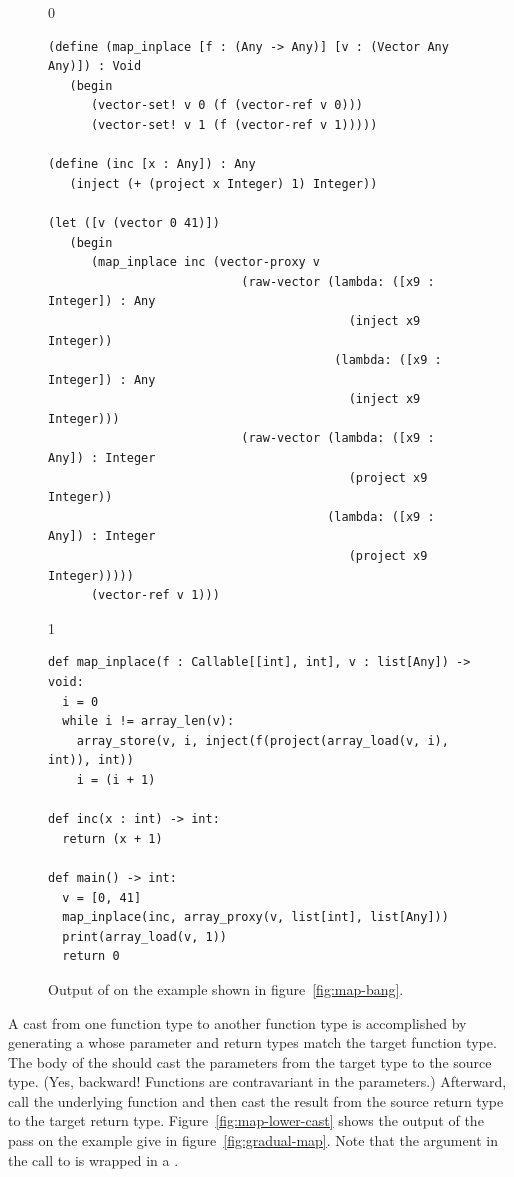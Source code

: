 \documentclass[7x10]{TimesAPriori_MIT}%
\def\racketEd{0}
\def\pythonEd{1}
\def\edition{1}
\newcommand{\pythonColor}[0]{}
\numberwithin{theorem}{chapter}
\numberwithin{definition}{chapter}
\numberwithin{equation}{chapter}
\begin{document}
\begin{figure}[tbp]
\begin{tcolorbox}[colback=white]  
{\if\edition\racketEd    
\begin{lstlisting}
(define (map_inplace [f : (Any -> Any)] [v : (Vector Any Any)]) : Void
   (begin 
      (vector-set! v 0 (f (vector-ref v 0)))
      (vector-set! v 1 (f (vector-ref v 1)))))
  
(define (inc [x : Any]) : Any
   (inject (+ (project x Integer) 1) Integer))

(let ([v (vector 0 41)])
   (begin 
      (map_inplace inc (vector-proxy v
                           (raw-vector (lambda: ([x9 : Integer]) : Any
                                          (inject x9 Integer))
                                        (lambda: ([x9 : Integer]) : Any
                                          (inject x9 Integer)))
                           (raw-vector (lambda: ([x9 : Any]) : Integer
                                          (project x9 Integer))
                                       (lambda: ([x9 : Any]) : Integer
                                          (project x9 Integer)))))
      (vector-ref v 1)))
\end{lstlisting}
\fi}
{\if\edition\pythonEd\pythonColor
\begin{lstlisting}[basicstyle=\ttfamily\footnotesize]
def map_inplace(f : Callable[[int], int], v : list[Any]) -> void:
  i = 0
  while i != array_len(v):
    array_store(v, i, inject(f(project(array_load(v, i), int)), int))
    i = (i + 1)

def inc(x : int) -> int:
  return (x + 1)

def main() -> int:
  v = [0, 41]
  map_inplace(inc, array_proxy(v, list[int], list[Any]))
  print(array_load(v, 1))
  return 0
\end{lstlisting}
\fi}
\end{tcolorbox}

\caption{Output of  on the example shown in
  figure~\ref{fig:map-bang}.}
\label{fig:map-bang-lower-cast}
\end{figure}

A cast from one function type to another function type is accomplished
by generating a  whose parameter and return types match
the target function type. The body of the  should cast
the parameters from the target type to the source type. (Yes,
backward! Functions are contravariant
in the parameters.) Afterward, call the underlying function and then
cast the result from the source return type to the target return type.
Figure~\ref{fig:map-lower-cast} shows the output of the
 pass on the  example give in
figure~\ref{fig:gradual-map}. Note that the  argument in the
call to  is wrapped in a .
\end{document}
